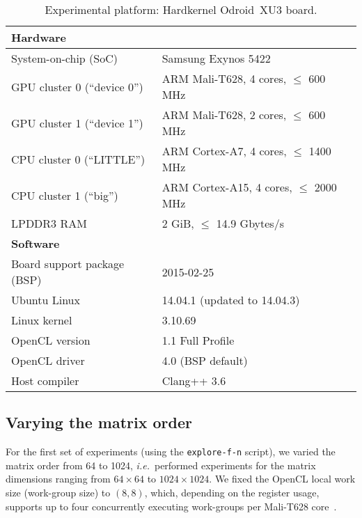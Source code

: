 \documentclass{acm_proc_article-sp} %
\begin{document}
\begin{table*}
\centering
\caption{\label{Odroid}Experimental platform: Hardkernel Odroid~XU3 board.}
  \begin{tabular}{ll}
  \toprule
  {\bf Hardware}   &\\
  \midrule
  System-on-chip (SoC)         & Samsung Exynos 5422                     \\
  GPU cluster 0 (``device 0'') & ARM Mali-T628,  4 cores, $\le$ 600 MHz  \\
  GPU cluster 1 (``device 1'') & ARM Mali-T628,  2 cores, $\le$ 600 MHz  \\
  CPU cluster 0 (``LITTLE'')   & ARM Cortex-A7,  4 cores, $\le$ 1400 MHz \\
  CPU cluster 1 (``big'')      & ARM Cortex-A15, 4 cores, $\le$ 2000 MHz \\
  LPDDR3 RAM                   & 2 GiB, $\le$ 14.9 Gbytes/s              \\
  \midrule
  {\bf Software}   &\\
  \midrule
  Board support package (BSP)  & 2015-02-25                    \\
  Ubuntu Linux                 & 14.04.1 (updated to 14.04.3)  \\
  Linux kernel                 & 3.10.69                       \\
  OpenCL version               & 1.1 Full Profile              \\
  OpenCL driver                & 4.0 (BSP default)             \\
  Host compiler                & Clang++ 3.6                   \\
  \bottomrule
  \end{tabular}
\end{table*}


\subsection{Varying the matrix order}
\label{sec:order}

For the first set of experiments (using the {\tt explore-f-n} script), we
varied the matrix order from 64 to 1024, {\em i.e.}\ performed experiments for
the matrix dimensions ranging from $64 \times 64$ to $1024 \times 1024$.
%
We fixed the OpenCL local work size (work-group size) to $(8,8)$, which,
depending on the register usage, supports up to four concurrently executing
work-groups per Mali-T628 core~\cite{Gronqvist:2014}.
\end{document}
